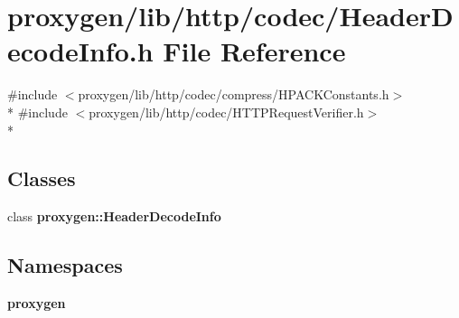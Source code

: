 \section{proxygen/lib/http/codec/\+Header\+Decode\+Info.h File Reference}
\label{HeaderDecodeInfo_8h}
{\ttfamily \#include $<$proxygen/lib/http/codec/compress/\+H\+P\+A\+C\+K\+Constants.\+h$>$}\\*
{\ttfamily \#include $<$proxygen/lib/http/codec/\+H\+T\+T\+P\+Request\+Verifier.\+h$>$}\\*
\subsection*{Classes}
\begin{DoxyCompactItemize}
\item 
class {\bf proxygen\+::\+Header\+Decode\+Info}
\end{DoxyCompactItemize}
\subsection*{Namespaces}
\begin{DoxyCompactItemize}
\item 
 {\bf proxygen}
\end{DoxyCompactItemize}
